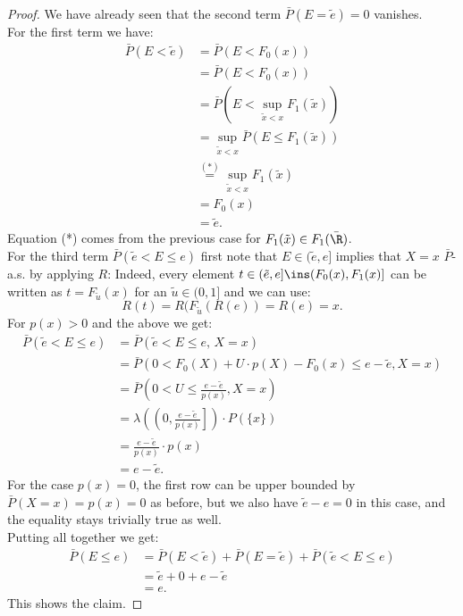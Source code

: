 \begin{Lem}
\begin{proof}
%
We have already seen that the second term $\bar P(E=\tilde e) =0$ vanishes.\\
For the first term we have:
\begin{align*}
 \bar P(E < \tilde e)
    &= \bar P(E < F_0(x) ) \\
    &= \bar P(E < F_0(x) ) \\
    &=  \bar P( E < \sup_{\tilde{x} < x}F_1(\tilde{x}) ) \\
    &= \sup_{\tilde{x} < x} \bar P( E \le F_1(\tilde{x}) ) \\
    &\stackrel{(*)}{=} \sup_{\tilde{x} < x}  F_1(\tilde{x}) \\
    &= F_0(x)\\
    &= \tilde e.
\end{align*}
Equation (*) comes from the previous case for $F_1(\tilde x) \in F_1(\bar\R)$.\\
For the third term $\bar P(\tilde e< E \le e)$ first note that $E \in (\tilde e,e]$ implies that $X=x$ $\bar P$-a.s. by applying $R$: Indeed, every element 
$t \in (\tilde e,e] \ins (F_0(x),F_1(x)]$ can be written as $t=F_{\tilde u}(x)$ for an $\tilde u \in (0,1]$ and we can use:
\[ R(t)=R(F_{\tilde u}(R(e))=R(e)=x.\]
For $p(x)>0$ and the above we get:
\begin{align*}
   \bar P(\tilde e< E \le e) 
 &= \bar P(\tilde e< E \le e,\, X=x)\\
  &= \bar P( 0< F_0(X)+U\cdot p(X) - F_0(x) \le e-\tilde e, X=x) \\
 &= \bar P( 0< U \le  \frac{e-\tilde e}{p(x)}, X=x) \\
 &= \lambda\left( \left(0,  \frac{e-\tilde e}{p(x)} \right]\right) \cdot P(\{x\}) \\
 &= \frac{e-\tilde e}{p(x)} \cdot p(x) \\
 &= e-\tilde e.
\end{align*}
For the case $p(x)=0$, the first row can be upper bounded by $\bar P(X=x)=p(x)=0$ as before, but we also have $\tilde e - e=0$ in this case, and the equality stays trivially true as well.\\
Putting all together we get:
    \begin{align*}
 \bar P(E \le e) &= \bar P(E < \tilde e) + \bar P(E=\tilde e) + \bar P(\tilde e< E \le e) \\
                         &= \tilde e + 0 + e - \tilde e\\
                         &= e.
    \end{align*}
This shows the claim.
\end{proof}
\end{Lem}


